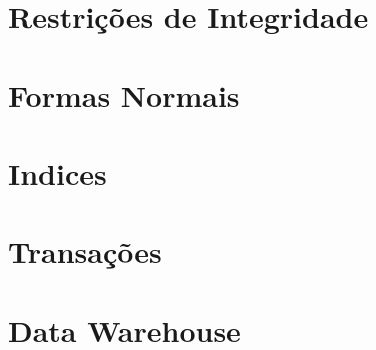\documentclass[11pt,a4paper]{article}
\begin{document}
\newpage

\section{Restrições de Integridade}
\newpage

\section{Formas Normais}\newpage
\newpage

\section{Indices}
\newpage

\section{Transações}
\newpage

\section{Data Warehouse}
\end{document}
